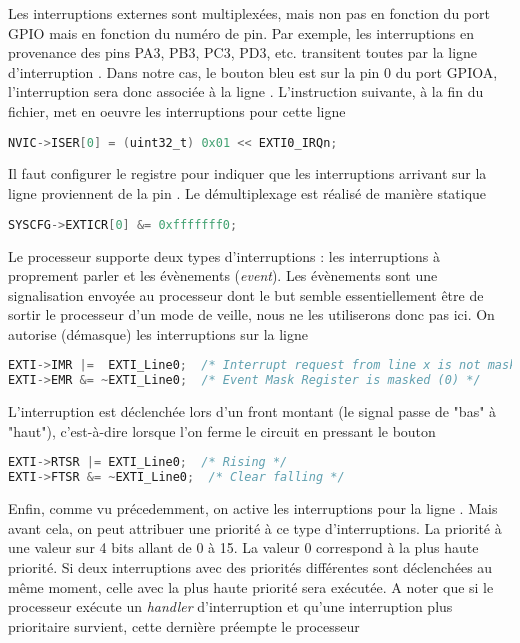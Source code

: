 \documentclass{FicheLecture}
\begin{document}
Les interruptions externes sont multiplexées, mais non pas en fonction du port GPIO mais en fonction du numéro de pin. Par exemple, les interruptions en provenance des pins PA3, PB3, PC3, PD3, etc. transitent toutes par la ligne d'interruption . Dans notre cas, le bouton bleu est sur la pin 0 du port GPIOA, l'interruption sera donc associée à la ligne . L'instruction suivante, à la fin du fichier, met en oeuvre les interruptions pour cette ligne

\begin{lstlisting}[language=C]
NVIC->ISER[0] = (uint32_t) 0x01 << EXTI0_IRQn;
\end{lstlisting}

Il faut configurer le registre  pour indiquer que les interruptions arrivant sur la ligne  proviennent de la pin . Le démultiplexage est réalisé de manière statique

\begin{lstlisting}[language=C]
SYSCFG->EXTICR[0] &= 0xfffffff0;
\end{lstlisting}

Le processeur supporte deux types d'interruptions : les interruptions à proprement parler et les évènements (\emph{event}). Les évènements sont une signalisation envoyée au processeur dont le but semble essentiellement être de sortir le processeur d'un mode de veille, nous ne les utiliserons donc pas ici. On autorise (démasque) les interruptions sur la ligne 

\begin{lstlisting}[language=C]
EXTI->IMR |=  EXTI_Line0;  /* Interrupt request from line x is not masked (1) */
EXTI->EMR &= ~EXTI_Line0;  /* Event Mask Register is masked (0) */
\end{lstlisting}

L'interruption est déclenchée lors d'un front montant (le signal passe de "bas" à "haut"), c'est-à-dire lorsque l'on ferme le circuit en pressant le bouton 

\begin{lstlisting}[language=C]
EXTI->RTSR |= EXTI_Line0;  /* Rising */
EXTI->FTSR &= ~EXTI_Line0;  /* Clear falling */
\end{lstlisting}

Enfin, comme vu précedemment, on active les interruptions pour la ligne . Mais avant cela, on peut attribuer une priorité à ce type d'interruptions. La priorité à une valeur sur 4 bits allant de 0 à 15. La valeur 0 correspond à la plus haute priorité. Si deux interruptions avec des priorités différentes sont déclenchées au même moment, celle avec la plus haute priorité sera exécutée. A noter que si le processeur exécute un \emph{handler} d'interruption et qu'une interruption plus prioritaire survient, cette dernière préempte le processeur
\end{document}
